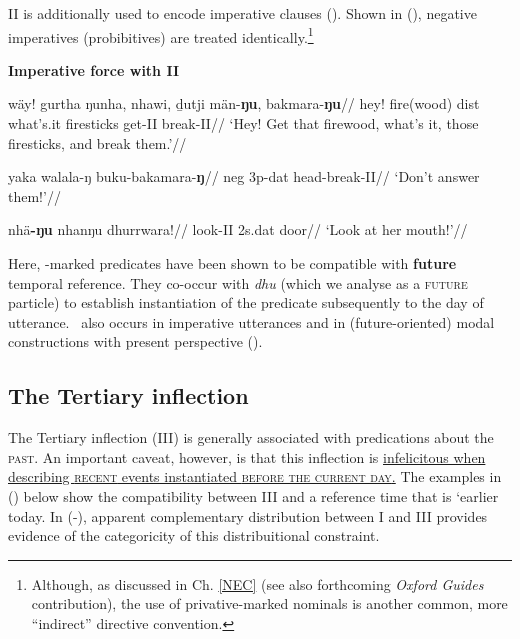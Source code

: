 \gls{II} is additionally used to encode imperative clauses (). Shown in (), negative imperatives (probibitives) are treated identically.\footnote{Although, as discussed in Ch. \ref{NEC} (see also \citeauthor{Phillips2021b} forthcoming \textit{Oxford Guides} contribution), the use of privative-marked nominals is another common, more ``indirect'' directive convention.}

\pex\textbf{Imperative force with \gls{II}}

\a\begingl\gla wäy! gurtha ŋunha, nhawi, ḏutji män-\textbf{ŋu}, bakmara-\textbf{ŋu}//
\glb hey! fire(wood) \gls{dist} what's.it firesticks get-\gls{II} break-\gls{II}//
\glft`Hey! Get that firewood, what's it, those firesticks, and break them.'//\endgl

\a{}\begingl\gla yaka walala-ŋ buku-bakamara-\textbf{ŋ}//
\glb \gls{neg} 3p-\gls{dat} head-break-\gls{II}//
\glft `Don't answer them!'//\endgl


\a\begingl\gla nhä\textbf{-ŋu} nhanŋu dhurrwara!//
\glb look-\gls{II} 2s.\gls{dat} door//
\glft`Look at her mouth!'\trailingcitation[AW 20180731]//\endgl

\xe

Here, \II-marked predicates have been shown to be compatible with \textbf{future} temporal reference. They co-occur with \textit{dhu} (which we analyse as a \textsc{future} particle) to establish instantiation of the predicate subsequently to the day of utterance. \II~also occurs in imperative utterances and in (future-oriented) modal constructions with present perspective ().


\subsection{The Tertiary inflection}\label{desc-iii}

The Tertiary inflection (\gls{III}) is generally associated with predications about the \textsc{past}. An important caveat, however, is that this inflection is \ul{infelicitous when describing \textsc{recent} events instantiated \textsc{before the current day}.} The examples in (\nextx) below show the compatibility between \gls{III} and a reference time that is `earlier today. In (-), apparent complementary distribution between \gls{I} and \gls{III} provides evidence of the categoricity of this distribuitional constraint.

